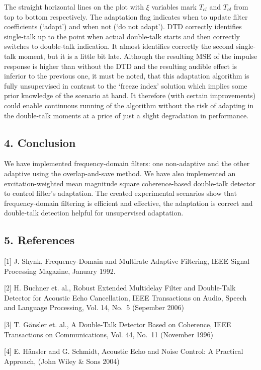 \documentclass[11pt]{article}
\begin{document}
    The straight horizontal lines on the plot with \(\xi\) variables mark
\(T_{cl}\) and \(T_{ol}\) from top to bottom respectively. The
adaptation flag indicates when to update filter coefficients (`adapt')
and when not (`do not adapt'). DTD correctly identifies single-talk up
to the point when actual double-talk starts and then correctly switches
to double-talk indication. It almost identifies correctly the second
single-talk moment, but it is a little bit late. Although the resulting
MSE of the impulse response is higher than without the DTD and the
resulting audible effect is inferior to the previous one, it must be
noted, that this adaptation algorithm is fully unsupervised in contrast
to the `freeze index' solution which implies some prior knowledge of the
scenario at hand. It therefore (with certain improvements) could enable
continuous running of the algorithm without the risk of adapting in the
double-talk moments at a price of just a slight degradation in
performance.

    \hypertarget{conclusion}{%
\subsection{4. Conclusion}\label{conclusion}}

We have implemented frequency-domain filters: one non-adaptive and the
other adaptive using the overlap-and-save method. We have also
implemented an excitation-weighted mean magnitude square coherence-based
double-talk detector to control filter's adaptation. The created
experimental scenarios show that frequency-domain filtering is efficient
and effective, the adaptation is correct and double-talk detection
helpful for unsupervised adaptation.

    \hypertarget{references}{%
\subsection{5. References}\label{references}}

{[}1{]} J. Shynk, Frequency-Domain and Multirate Adaptive Filtering,
IEEE Signal Processing Magazine, January 1992.

{[}2{]} H. Buchner et. al., Robust Extended Multidelay Filter and
Double-Talk Detector for Acoustic Echo Cancellation, IEEE Transactions
on Audio, Speech and Language Processing, Vol. 14, No.~5 (Sepember 2006)

{[}3{]} T. Gänsler et. al., A Double-Talk Detector Based on Coherence,
IEEE Transactions on Communications, Vol. 44, No.~11 (November 1996)

{[}4{]} E. Hänsler and G. Schmidt, Acoustic Echo and Noise Control: A
Practical Approach, (John Wiley \& Sons 2004)


    
    
    
\end{document}
